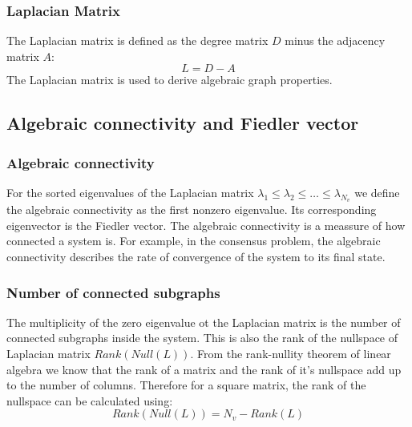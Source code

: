 \documentclass[a4paper,twoside, openright,12pt]{report}
\begin{document}
\subsubsection{Laplacian Matrix}
The Laplacian matrix is defined as the degree matrix $D$ minus the adjacency matrix $A$:
\begin{equation}
 L = D - A
\end{equation} 
The Laplacian matrix is used to derive algebraic graph properties.

\subsection{Algebraic connectivity and Fiedler vector}
\subsubsection{Algebraic connectivity}
For the sorted eigenvalues of the Laplacian matrix
$ \lambda_1 \leq \lambda_2 \leq \ldots \leq \lambda_{N_v} $
we define the algebraic connectivity as the first nonzero eigenvalue. Its corresponding eigenvector is the Fiedler vector.
The algebraic connectivity is a meassure of how connected a system is. For example, in the consensus problem, the algebraic connectivity describes the rate of convergence of the system to its final state. 

\subsubsection{Number of connected subgraphs}
The multiplicity of the zero eigenvalue ot the Laplacian matrix is the number of connected subgraphs inside the system. This is also the rank of the nullspace of Laplacian matrix
$Rank( {Null}(L)) $.
From the rank-nullity theorem of linear algebra we know that the rank of a matrix and the rank of it's nullspace add up to the number of columns. Therefore for a square matrix, the rank of the nullspace can be calculated using:
 \begin{equation}
 Rank( {Null}(L) ) = N_v -  Rank(L)
\end{equation} 
\vspace{10cm}
%
%
\pagebreak 
\end{document}
